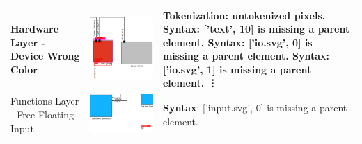 \begin{longtable}{p{} >{\raggedright\arraybackslash}m{} >{\raggedright\arraybackslash}m{}}
    Hardware Layer - Device Wrong Color &  \includegraphics[width=1\linewidth]{pictures/32_wrong_color_task_output_clip.png} & \textbf{Tokenization}: untokenized pixels. \newline
        \textbf{Syntax}: ['text', 10] is missing a parent element. \newline
        \textbf{Syntax}: ['io.svg', 0] is missing a parent element. \newline
        \textbf{Syntax}: ['io.svg', 1] is missing a parent element. \newline
        \vdots \\
    \midrule
    Functions Layer - Free Floating Input & \includegraphics[width=1\linewidth]{pictures/40_free_floating_input_output_clip.png} & \textbf{Syntax}: ['input.svg', 0] is missing a parent element. \newline

\end{longtable}
